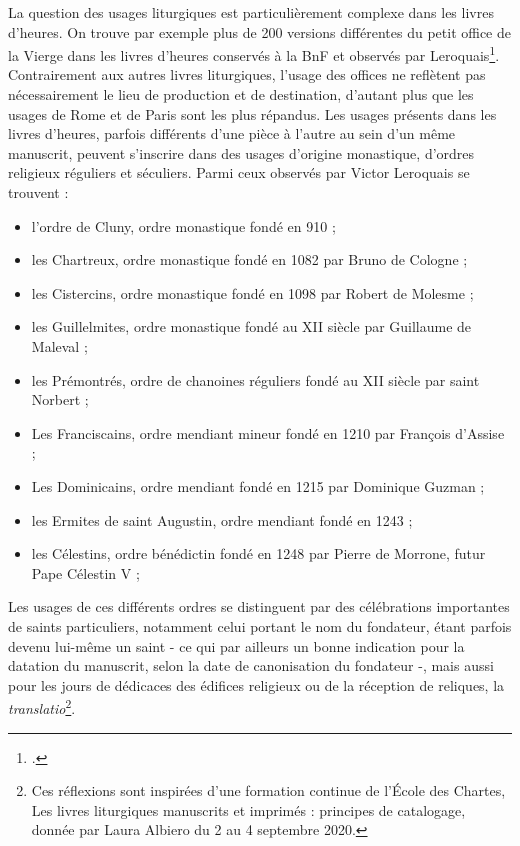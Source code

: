 \documentclass[a4paper,12pt,twoside]{book}
\begin{document}
	La question des usages liturgiques est particulièrement complexe dans les livres d'heures. On trouve par exemple plus de 200 versions différentes du petit office de la Vierge dans les livres d'heures conservés à la BnF et observés par Leroquais\footcite[p. XXXVI]{Leroquais_notices}. Contrairement aux autres livres liturgiques, l'usage des offices ne reflètent pas nécessairement le lieu de production et de destination, d'autant plus que les usages de Rome et de Paris sont les plus répandus. Les usages présents dans les livres d'heures, parfois différents d'une pièce à l'autre au sein d'un même manuscrit, peuvent s'inscrire dans des usages d'origine monastique, d'ordres religieux réguliers et séculiers. Parmi ceux observés par Victor Leroquais se trouvent : 
	\begin{itemize}
		\item l'ordre de Cluny, ordre monastique fondé en 910 ;
		\item les Chartreux, ordre monastique fondé en 1082 par Bruno de Cologne ;
	    \item les Cistercins, ordre monastique fondé en 1098 par Robert de Molesme ;
	    \item les Guillelmites, ordre monastique fondé au \textsc{XII} siècle par Guillaume de Maleval ;
	    \item les Prémontrés, ordre de chanoines réguliers fondé au \textsc{XII} siècle par saint Norbert ;
	    \item Les Franciscains, ordre mendiant mineur fondé en 1210 par François d’Assise ;
	    \item Les Dominicains, ordre mendiant fondé en 1215 par Dominique Guzman ;
	    \item les Ermites de saint Augustin, ordre mendiant fondé en 1243 ;
	    \item les Célestins, ordre bénédictin fondé en 1248 par Pierre de Morrone, futur Pape Célestin V ;
	\end{itemize}
	
	Les usages de ces différents ordres se distinguent par des célébrations importantes de saints particuliers, notamment celui portant le nom du fondateur, étant parfois devenu lui-même un saint - ce qui par ailleurs un bonne indication pour la datation du manuscrit, selon la date de canonisation du fondateur -, mais aussi pour les jours de dédicaces des édifices religieux ou de la réception de reliques, la \textit{translatio}\footnote{Ces réflexions sont inspirées d'une formation continue de l'École des Chartes, \og Les livres liturgiques manuscrits et imprimés : principes de catalogage\fg{}, donnée par Laura Albiero du 2 au 4 septembre 2020.}.\\
	
\end{document}
